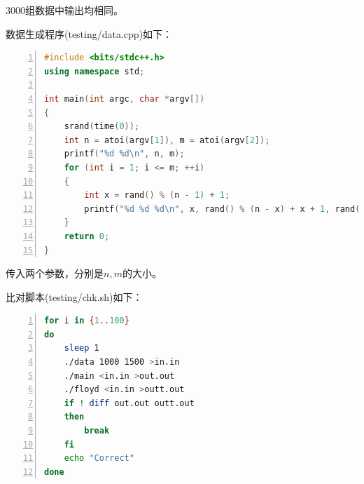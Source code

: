\documentclass{article}
\begin{document}
3000组数据中输出均相同。

数据生成程序(testing/data.cpp)如下：

\begin{lstlisting}[language={C++},
    numbers=left,
    numberstyle=\tiny\consolas,
    basicstyle=\small\consolas]
#include <bits/stdc++.h>
using namespace std;

int main(int argc, char *argv[])
{
    srand(time(0));
    int n = atoi(argv[1]), m = atoi(argv[2]);
    printf("%d %d\n", n, m);
    for (int i = 1; i <= m; ++i)
    {
        int x = rand() % (n - 1) + 1;
        printf("%d %d %d\n", x, rand() % (n - x) + x + 1, rand() % 100 + 1);
    }
    return 0;
}
\end{lstlisting}

传入两个参数，分别是$n,m$的大小。

比对脚本(testing/chk.sh)如下：

\begin{lstlisting}[language={bash},
    numbers=left,
    numberstyle=\tiny\consolas,
    basicstyle=\small\consolas]
for i in {1..100}
do
    sleep 1
    ./data 1000 1500 >in.in
    ./main <in.in >out.out
    ./floyd <in.in >outt.out
    if ! diff out.out outt.out
    then
        break
    fi
    echo "Correct"
done
\end{lstlisting}
\end{document}
